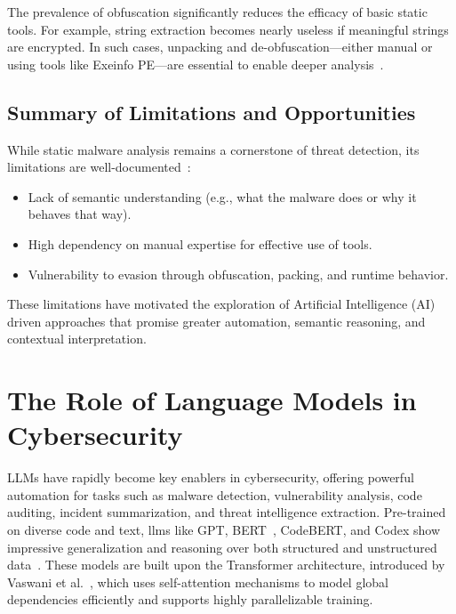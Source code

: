 The prevalence of obfuscation significantly reduces the efficacy of basic static tools. For
example, string extraction becomes nearly useless if meaningful strings are encrypted. In such
cases, unpacking and de-obfuscation—either manual or using tools like Exeinfo PE—are essential to
enable deeper analysis~\cite{wong2021practice}.

\subsection{Summary of Limitations and Opportunities}\label{subsec:StaticLimitations}
While static malware analysis remains a cornerstone of threat detection, its limitations are
well-documented~\cite{wong2021practice, fedak2020fundamentals}:
\begin{itemize}
	\item Lack of semantic understanding (e.g., what the malware does or why it behaves that way).
	\item High dependency on manual expertise for effective use of tools.
	\item Vulnerability to evasion through obfuscation, packing, and runtime behavior.
\end{itemize}

These limitations have motivated the exploration of Artificial Intelligence (AI) driven approaches
that promise greater automation, semantic reasoning, and contextual interpretation.

\section{The Role of Language Models in Cybersecurity}\label{sec:LLMRoleInCyber}
\gls{LLMs} have rapidly become key enablers in cybersecurity, offering powerful automation for tasks such
as malware detection, vulnerability analysis, code auditing, incident summarization, and threat
intelligence extraction. Pre-trained on diverse code and text, \glspl{llm} like
GPT, BERT~\cite{devlin2019bert}, CodeBERT, and Codex show
impressive generalization and reasoning over both structured and unstructured
data~\cite{nourmohammadzadeh2024llmsurvey, sahoo2024systematic, ferrag2024allinsights, metta2024generativeai}.
These models are built upon the Transformer architecture, introduced by Vaswani et
al.~\cite{vaswani2023attentionneed}, which uses self-attention mechanisms to
model global dependencies efficiently and supports highly parallelizable training.


